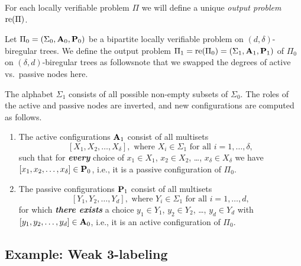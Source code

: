 For each locally verifiable problem $\Pi$ we will define a unique \emph{output problem} $\operatorname{re}(\Pi)$.

Let $\Pi_0 = (\Sigma_0, \mathbf{A}_0, \mathbf{P}_0)$ be a bipartite locally verifiable problem on $(d,\delta)$-biregular trees. We define the output problem $\Pi_1 = \operatorname{re}(\Pi_0) = (\Sigma_1, \mathbf{A}_1, \mathbf{P}_1)$ of $\Pi_0$ on $(\delta,d)$-biregular trees as follows\mydash note that we swapped the degrees of active vs.\ passive nodes here.

The alphabet $\Sigma_1$ consists of all possible non-empty subsets of $\Sigma_0$. The roles of the active and passive nodes are inverted, and new configurations are computed as follows.
\begin{enumerate}
	\item The active configurations $\mathbf{A}_1$ consist of all multisets
	\[
	[ X_1, X_2, \dotsc, X_{\delta} ], \text{ where } X_i \in \Sigma_1 \text{ for all } i = 1,\dotsc,\delta,
	\] 
	such that for \textbf{\emph{every}} choice of $x_1 \in X_1$, $x_2 \in X_2$, \ldots, $x_{\delta} \in X_{\delta}$ we have $[x_1, x_2, \dotsc, x_{\delta}] \in \mathbf{P}_0$, i.e., it is a passive configuration of $\Pi_0$.
	\item The passive configurations $\mathbf{P}_1$ consist of all multisets
	\[
	[ Y_1,  Y_2, \dotsc, Y_d ], \text{ where } Y_i \in \Sigma_1 \text{ for all } i = 1,\dotsc,d,
	\]
	for which \textbf{\emph{there exists}} a choice $y_1 \in Y_1$, $y_2 \in Y_2$, \ldots, $y_d \in Y_d$ with $[ y_1, y_2, \dotsc, y_d] \in \mathbf{A}_0$, i.e., it is an active configuration of $\Pi_0$.
\end{enumerate}

\subsection{Example: Weak 3-labeling} \label{ssec:example-w3ec}


